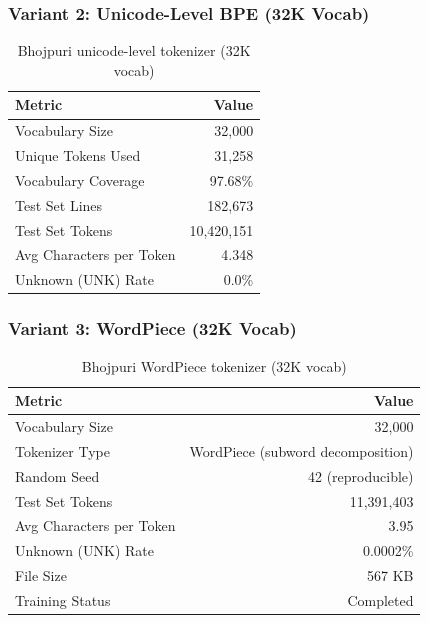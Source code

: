 \documentclass[11pt,a4paper]{article}
\begin{document}
\subsubsection{Variant 2: Unicode-Level BPE (32K Vocab)}

\begin{table}[H]
    \centering
    \small
    \begin{tabular}{|l|r|}
    \hline
    \textbf{Metric} & \textbf{Value} \\
    \hline
    Vocabulary Size & 32,000 \\
    Unique Tokens Used & 31,258 \\
    Vocabulary Coverage & 97.68\% \\
    \hline
    Test Set Lines & 182,673 \\
    Test Set Tokens & 10,420,151 \\
    Avg Characters per Token & 4.348 \\
    Unknown (UNK) Rate & 0.0\% \\
    \hline
    \end{tabular}
    \caption{Bhojpuri unicode-level tokenizer (32K vocab)}
    \label{tab:tokenizer_bhojpuri_unicode}
\end{table}


\subsubsection{Variant 3: WordPiece (32K Vocab)}

\begin{table}[H]
    \centering
    \small
    \begin{tabular}{|l|r|}
    \hline
    \textbf{Metric} & \textbf{Value} \\
    \hline
    Vocabulary Size & 32,000 \\
    Tokenizer Type & WordPiece (subword decomposition) \\
    Random Seed & 42 (reproducible) \\
    \hline
    Test Set Tokens & 11,391,403 \\
    Avg Characters per Token & 3.95 \\
    Unknown (UNK) Rate & 0.0002\% \\
    File Size & 567 KB \\
    Training Status & Completed \\
    \hline
    \end{tabular}
    \caption{Bhojpuri WordPiece tokenizer (32K vocab)}
    \label{tab:tokenizer_bhojpuri_wp}
\end{table}
\end{document}
